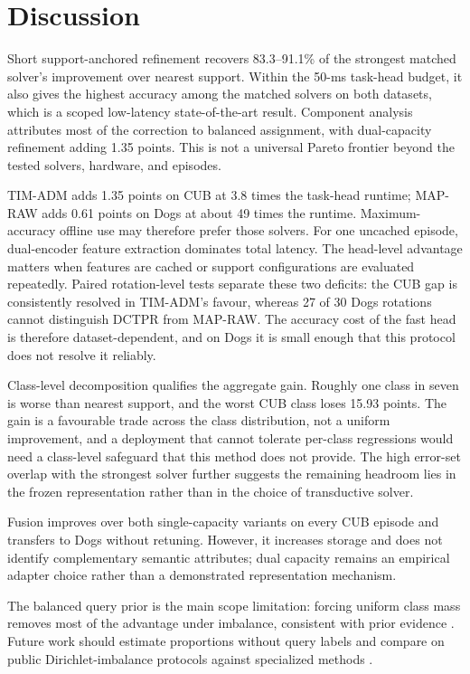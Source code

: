 \documentclass[]{spie}
\newcommand{\method}{\textsc{DCTPR}\xspace}
\begin{document}
\FloatBarrier
\section{Discussion}
\label{sec:discussion}

Short support-anchored refinement recovers 83.3--91.1\% of the strongest
matched solver's improvement over nearest support. Within the 50-ms task-head
budget, it also gives the highest accuracy among the matched solvers on both
datasets, which is a scoped low-latency state-of-the-art result. Component
analysis attributes most of the correction to balanced assignment, with
dual-capacity refinement adding 1.35 points. This is not a universal Pareto
frontier beyond the tested solvers, hardware, and episodes.

TIM-ADM adds 1.35 points on CUB at 3.8 times the task-head runtime; MAP-RAW adds
0.61 points on Dogs at about 49 times the runtime. Maximum-accuracy offline use
may therefore prefer those solvers. For one uncached episode, dual-encoder
feature extraction dominates total latency. The head-level advantage matters
when features are cached or support configurations are evaluated repeatedly.
Paired rotation-level tests separate these two deficits: the CUB gap is
consistently resolved in TIM-ADM's favour, whereas 27 of 30 Dogs rotations
cannot distinguish \method from MAP-RAW. The accuracy cost of the fast head is
therefore dataset-dependent, and on Dogs it is small enough that this protocol
does not resolve it reliably.

Class-level decomposition qualifies the aggregate gain. Roughly one class in
seven is worse than nearest support, and the worst CUB class loses 15.93 points.
The gain is a favourable trade across the class distribution, not a uniform
improvement, and a deployment that cannot tolerate per-class regressions would
need a class-level safeguard that this method does not provide. The high
error-set overlap with the strongest solver further suggests the remaining
headroom lies in the frozen representation rather than in the choice of
transductive solver.

Fusion improves over both single-capacity variants on every CUB episode and
transfers to Dogs without retuning. However, it increases storage and does not
identify complementary semantic attributes; dual capacity remains an empirical
adapter choice rather than a demonstrated representation mechanism.

The balanced query prior is the main scope limitation: forcing uniform class
mass removes most of the advantage under imbalance, consistent with prior
evidence \cite{realistictransduction}. Future work should estimate proportions
without query labels and compare on public Dirichlet-imbalance protocols against
specialized methods \cite{conditionaltransport,adaptivemanifold,paddle,unem}.
\end{document}
